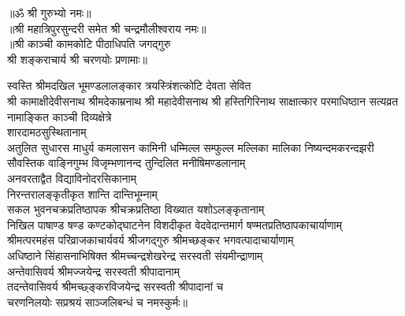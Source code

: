 \begin{center}
{॥ॐ श्री गुरुभ्यो नमः॥}\\
{॥श्री महात्रिपुरसुन्दरी समेत श्री चन्द्रमौलीश्वराय नमः॥}\\
{॥श्री काञ्ची कामकोटि पीठाधिपति जगद्गुरु\\ श्री शङ्कराचार्य श्री चरणयोः प्रणामाः॥}
\end{center}

\noindent स्वस्ति श्रीमदखिल भूमण्डलालङ्कार त्रयस्त्रिंशत्कोटि देवता सेवित\\
श्री कामाक्षीदेवीसनाथ श्रीमदेकाम्रनाथ श्री महादेवीसनाथ श्री हस्तिगिरिनाथ साक्षात्कार परमाधिष्ठान सत्यव्रत नामाङ्कित काञ्ची दिव्यक्षेत्रे\\
शारदामठसुस्थितानाम्\\
अतुलित सुधारस माधुर्य कमलासन कामिनी धम्मिल्ल सम्फुल्ल मल्लिका मालिका
निष्यन्दमकरन्दझरी सौवस्तिक वाङ्निगुम्भ विजृम्भणानन्द 
तुन्दिलित मनीषिमण्डलानाम्\\
अनवरताद्वैत विद्याविनोदरसिकानाम्\\
निरन्तरालङ्कृतीकृत शान्ति दान्तिभूम्नाम्\\
सकल भुवनचक्रप्रतिष्ठापक  श्रीचक्रप्रतिष्ठा विख्यात यशोऽलङ्कृतानाम्\\
निखिल पाषाण्ड षण्ड कण्टकोद्घाटनेन विशदीकृत वेदवेदान्तमार्ग
षण्मतप्रतिष्ठापकाचार्याणाम्\\
श्रीमत्परमहंस परिव्राजकाचार्यवर्य श्रीजगद्गुरु श्रीमच्छङ्कर भगवत्पादाचार्याणाम्\\
अधिष्ठाने सिंहासनाभिषिक्त श्रीमच्चन्द्रशेखरेन्द्र सरस्वती संयमीन्द्राणाम्\\
अन्तेवासिवर्य श्रीमज्जयेन्द्र सरस्वती श्रीपादानाम्\\
तदन्तेवासिवर्य श्रीमच्छ्ङ्करविजयेन्द्र सरस्वती श्रीपादानां च\\
चरणनिलयोः सप्रश्रयं साञ्जलिबन्धं च नमस्कुर्मः॥